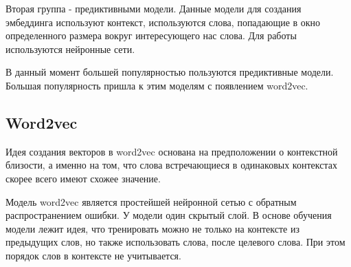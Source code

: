 \documentclass[a4paper,14pt]{article}
\begin{document}

Вторая группа - предиктивными модели.
Данные модели для создания эмбеддинга используют контекст, используются слова, попадающие в окно определенного размера вокруг интересующего нас слова.
Для работы используются нейронные сети.

В данный момент большей популярностью пользуются предиктивные модели.
Большая популярность пришла к этим моделям с появлением word2vec.

\subsection{Word2vec}
	
	Идея создания векторов в word2vec основана на предположении о контекстной близости, а именно на том, что слова встречающиеся в одинаковых контекстах скорее всего имеют схожее значение.
	
	Модель word2vec является простейшей нейронной сетью с обратным распространением ошибки.
	У модели один скрытый слой.
	В основе обучения модели лежит идея, что тренировать можно не только на контексте из предыдущих слов, но также использовать слова, после целевого слова.
	При этом порядок слов в контексте не учитывается.

	

\end{document}
